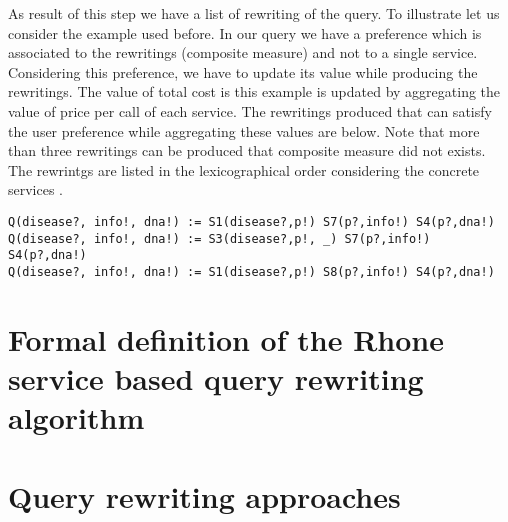 \documentclass[12pt,a4paper,oneside]{article}
\begin{document}
As result of this step we have a list of rewriting of the query. To illustrate let us consider the example used before.
In our query we have a preference which is associated to the rewritings (composite measure) and not to a single service. Considering this preference, we have to update its value while producing the rewritings.
The value of total cost is this example is updated by aggregating the value of price per call of each service. The rewritings produced that can satisfy the user preference while aggregating these values are below. Note that more than three rewritings can be produced that composite measure did not exists. The rewrintgs are listed in the lexicographical order considering the concrete services
.
\begin{verbatim}
Q(disease?, info!, dna!) := S1(disease?,p!) S7(p?,info!) S4(p?,dna!)
Q(disease?, info!, dna!) := S3(disease?,p!, _) S7(p?,info!) S4(p?,dna!)
Q(disease?, info!, dna!) := S1(disease?,p!) S8(p?,info!) S4(p?,dna!)
\end{verbatim}




\section{Formal definition of the Rhone service based query rewriting algorithm}


\section{Query rewriting approaches}




\end{document}
